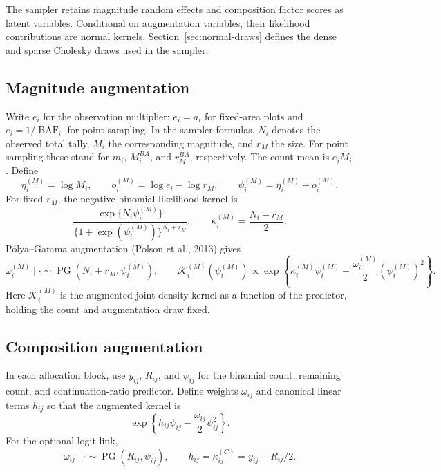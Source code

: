 \documentclass[11pt]{article}
\newcommand{\PG}{\operatorname{PG}}
\begin{document}
The sampler retains magnitude random effects and composition factor scores as
latent variables. Conditional on augmentation variables, their likelihood
contributions are normal kernels. Section~\ref{sec:normal-draws} defines the
dense and sparse Cholesky draws used in the sampler.

\subsection{Magnitude augmentation}

Write \(e_i\) for the observation multiplier: \(e_i=a_i\) for fixed-area
plots and \(e_i=1/\operatorname{BAF}_i\) for point sampling. In the sampler
formulas, \(N_i\) denotes the observed total tally, \(M_i\) the corresponding
magnitude, and \(r_M\) the size. For point sampling these stand for
\(m_i\), \(M_i^{BA}\), and \(r_M^{BA}\), respectively.
The count mean is \(e_iM_i\). Define
\begin{equation}
  \eta_i^{(M)}=\log M_i,\qquad
  o_i^{(M)}=\log e_i-\log r_M,\qquad
  \psi_i^{(M)}=\eta_i^{(M)}+o_i^{(M)}.
  \label{eq:nb-logit}
\end{equation}
For fixed \(r_M\), the negative-binomial likelihood kernel is
\begin{equation}
  \frac{\exp\{N_i\psi_i^{(M)}\}}
       {\{1+\exp(\psi_i^{(M)})\}^{N_i+r_M}},
  \qquad \kappa_i^{(M)}=\frac{N_i-r_M}{2}.
  \label{eq:nb-pg-kappa}
\end{equation}
P\'olya--Gamma augmentation (Polson et al., 2013) gives
\begin{equation}
  \omega_i^{(M)}\mid\cdot\sim\PG(N_i+r_M,\psi_i^{(M)}),
  \qquad
  \mathcal K_i^{(M)}(\psi_i^{(M)})\propto\exp\!\left\{\kappa_i^{(M)}\psi_i^{(M)}
    -\frac{\omega_i^{(M)}}{2}(\psi_i^{(M)})^2\right\}.
  \label{eq:pg-magnitude}
\end{equation}
Here \(\mathcal K_i^{(M)}\) is the augmented joint-density kernel as a
function of the predictor, holding the count and augmentation draw fixed.

\subsection{Composition augmentation}

In each allocation block, use \(y_{ij}\), \(R_{ij}\), and \(\psi_{ij}\)
for the binomial count, remaining count, and continuation-ratio predictor.
Define weights \(\omega_{ij}\) and canonical linear terms \(h_{ij}\) so
that the augmented kernel is
\begin{equation}
  \exp\!\left\{h_{ij}\psi_{ij}-\frac{\omega_{ij}}2\psi_{ij}^2\right\}.
  \label{eq:composition-augmented-kernel}
\end{equation}
For the optional logit link,
\begin{equation}
  \omega_{ij}\mid\cdot\sim\PG(R_{ij},\psi_{ij}),\qquad
  h_{ij}=\kappa_{ij}^{(C)}=y_{ij}-R_{ij}/2.
  \label{eq:pg-composition}
\end{equation}
\end{document}
